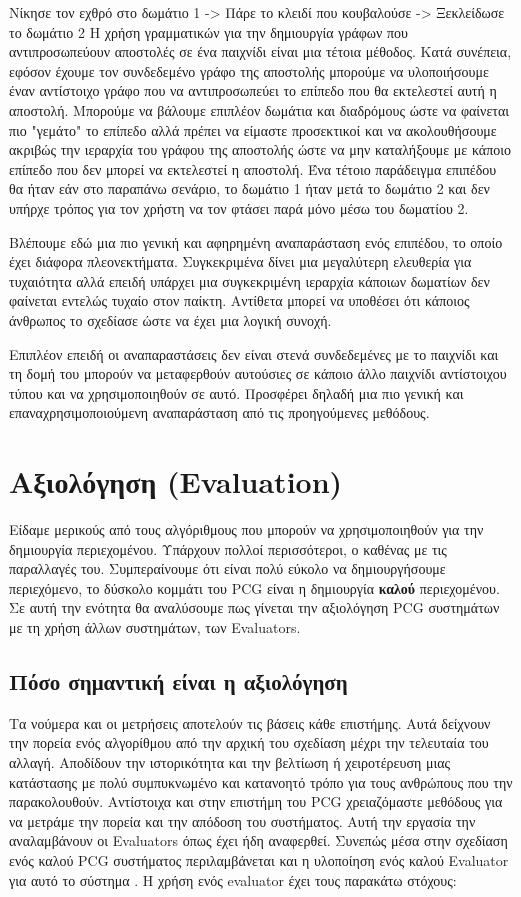 \newline
Νίκησε τον εχθρό στο δωμάτιο 1 -> Πάρε το κλειδί που κουβαλούσε -> Ξεκλείδωσε το δωμάτιο 2 
\newline
Η χρήση γραμματικών για την δημιουργία γράφων που αντιπροσωπεύουν αποστολές σε ένα παιχνίδι είναι μια τέτοια μέθοδος. Κατά συνέπεια, εφόσον έχουμε τον συνδεδεμένο γράφο της αποστολής μπορούμε να υλοποιήσουμε έναν αντίστοιχο γράφο που να αντιπροσωπεύει το επίπεδο που θα εκτελεστεί αυτή η αποστολή. Μπορούμε να βάλουμε επιπλέον δωμάτια και διαδρόμους ώστε να φαίνεται πιο "γεμάτο" το επίπεδο αλλά πρέπει να είμαστε προσεκτικοί και να ακολουθήσουμε ακριβώς την ιεραρχία του γράφου της αποστολής ώστε να μην καταλήξουμε με κάποιο επίπεδο που δεν μπορεί να εκτελεστεί η αποστολή. Ένα τέτοιο παράδειγμα επιπέδου θα ήταν εάν στο παραπάνω σενάριο, το δωμάτιο 1 ήταν μετά το δωμάτιο 2 και δεν υπήρχε τρόπος για τον χρήστη να τον φτάσει παρά μόνο μέσω του δωματίου 2.
\par
Βλέπουμε εδώ μια πιο γενική και αφηρημένη αναπαράσταση ενός επιπέδου, το οποίο έχει διάφορα πλεονεκτήματα. Συγκεκριμένα δίνει μια μεγαλύτερη ελευθερία για τυχαιότητα αλλά επειδή υπάρχει μια συγκεκριμένη ιεραρχία κάποιων δωματίων δεν φαίνεται εντελώς τυχαίο στον παίκτη. Αντίθετα μπορεί να υποθέσει ότι κάποιος άνθρωπος το σχεδίασε ώστε να έχει μια λογική συνοχή.
\par
Επιπλέον επειδή οι αναπαραστάσεις δεν είναι στενά συνδεδεμένες με το παιχνίδι και τη δομή του μπορούν να μεταφερθούν αυτούσιες σε κάποιο άλλο παιχνίδι αντίστοιχου τύπου και να χρησιμοποιηθούν σε αυτό. Προσφέρει δηλαδή μια πιο γενική και επαναχρησιμοποιούμενη αναπαράσταση από τις προηγούμενες μεθόδους.


\section{Αξιολόγηση (Evaluation)}
Είδαμε μερικούς από τους αλγόριθμους που μπορούν να χρησιμοποιηθούν για την δημιουργία περιεχομένου. Υπάρχουν πολλοί περισσότεροι, ο καθένας με τις παραλλαγές του. Συμπεραίνουμε ότι είναι πολύ εύκολο να δημιουργήσουμε περιεχόμενο, το δύσκολο κομμάτι του PCG είναι η δημιουργία \textbf{καλού} περιεχομένου. Σε αυτή την ενότητα θα αναλύσουμε πως γίνεται την αξιολόγηση PCG συστημάτων με τη χρήση άλλων συστημάτων, των Evaluators. \cite{pcgevaluation}

\subsection{Πόσο σημαντική είναι η αξιολόγηση}
Τα νούμερα και οι μετρήσεις αποτελούν τις βάσεις κάθε επιστήμης. Αυτά δείχνουν την πορεία ενός αλγορίθμου από την αρχική του σχεδίαση μέχρι την τελευταία του αλλαγή. Αποδίδουν την ιστορικότητα και την βελτίωση ή χειροτέρευση μιας κατάστασης με πολύ συμπυκνωμένο και κατανοητό τρόπο για τους ανθρώπους που την παρακολουθούν. Αντίστοιχα και στην επιστήμη του PCG χρειαζόμαστε μεθόδους για να μετράμε την πορεία και την απόδοση του συστήματος. Αυτή την εργασία την αναλαμβάνουν οι Evaluators όπως έχει ήδη αναφερθεί. Συνεπώς μέσα στην σχεδίαση ενός καλού PCG συστήματος περιλαμβάνεται και η υλοποίηση ενός καλού Evaluator για αυτό το σύστημα \cite{genericevaluation}. Η χρήση ενός evaluator έχει τους παρακάτω στόχους:

